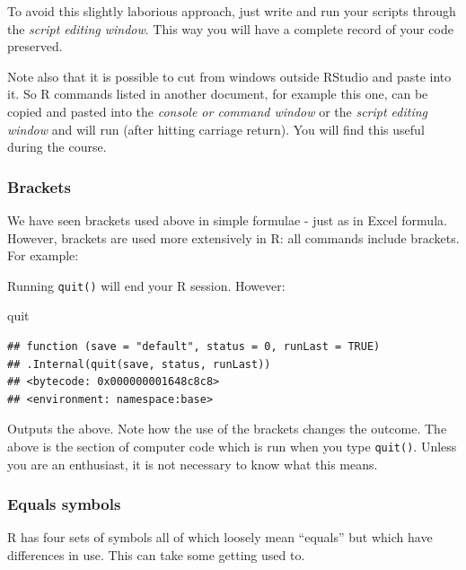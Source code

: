 \documentclass[
]{book}
\makeatletter
\newenvironment{Shaded}{\begin{snugshade}}{\end{snugshade}}
\newcommand{\NormalTok}[1]{#1}
\newenvironment{kframe}{%
\medskip{}
\setlength{\fboxsep}{.8em}
 \def\at@end@of@kframe{}%
 \ifinner\ifhmode%
  \def\at@end@of@kframe{\end{minipage}}%
  \begin{minipage}{\columnwidth}%
 \fi\fi%
 \def\FrameCommand##1{\hskip\@totalleftmargin \hskip-\fboxsep
 \colorbox{shadecolor}{##1}\hskip-\fboxsep
     \hskip-\linewidth \hskip-\@totalleftmargin \hskip\columnwidth}%
 \MakeFramed {\advance\hsize-\width
   \@totalleftmargin\z@ \linewidth\hsize
   \@setminipage}}%
 {\par\unskip\endMakeFramed%
 \at@end@of@kframe}
\newenvironment{rmdblock}[1]
  {
  \begin{itemize}
  \renewcommand{\labelitemi}{
    \raisebox{-.7\height}[0pt][0pt]{
      {\setkeys{Gin}{width=3em,keepaspectratio}\texttt{[image: images/\#1]}}
    }
  }
  \setlength{\fboxsep}{1em}
  \begin{kframe}
  \item
  }
  {
  \end{kframe}
  \end{itemize}
  }
\newenvironment{rmdnote}
  {\begin{rmdblock}{note}}
  {\end{rmdblock}}
\makeatother
\begin{document}
To avoid this slightly laborious approach, just write and run your scripts through the \emph{script editing window}. This way you will have a complete record of your code preserved.

\begin{rmdnote}
Note also that it is possible to cut from windows outside RStudio and paste into it. So R commands listed in another document, for example this one, can be copied and pasted into the \emph{console or command window} or the \emph{script editing window} and will run (after hitting carriage return). You will find this useful during the course.
\end{rmdnote}

\hypertarget{brackets}{%
\subsubsection{Brackets}\label{brackets}}

We have seen brackets used above in simple formulae - just as in Excel formula. However, brackets are used more extensively in R: all commands include brackets. For example:

Running \texttt{quit()} will end your R session. However:

\begin{Shaded}
\begin{Highlighting}[]
\NormalTok{quit}
\end{Highlighting}
\end{Shaded}

\begin{verbatim}
## function (save = "default", status = 0, runLast = TRUE) 
## .Internal(quit(save, status, runLast))
## <bytecode: 0x000000001648c8c8>
## <environment: namespace:base>
\end{verbatim}

Outputs the above. Note how the use of the brackets changes the outcome. The above is the section of computer code which is run when you type \texttt{quit()}. Unless you are an enthusiast, it is not necessary to know what this means.

\hypertarget{equals-symbols}{%
\subsubsection{Equals symbols}\label{equals-symbols}}

R has four sets of symbols all of which loosely mean ``equals'' but which have differences in use. This can take some getting used to.
\end{document}
